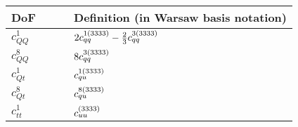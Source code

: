 \begin{table}[htbp] 
  \begin{center}
    \renewcommand{\arraystretch}{1.53}
        \begin{tabular}{ll}
          \toprule
          DoF $\qquad$ &  Definition (in  Warsaw basis notation) \\
          \midrule
      $c_{QQ}^1$    &   $2\ccc{1}{qq}{3333}-\frac{2}{3}\ccc{3}{qq}{3333}$ \\ \hline
    $c_{QQ}^8$       &         $8\ccc{3}{qq}{3333}$\\  \hline
 $c_{Qt}^1$         &         $\ccc{1}{qu}{3333}$\\   \hline
 $c_{Qt}^8$         &         $\ccc{8}{qu}{3333}$\\   \hline
  $c_{tt}^1$         &     $\ccc{}{uu}{3333}$  \\    \hline

\end{tabular}
\end{center}
\end{table}
